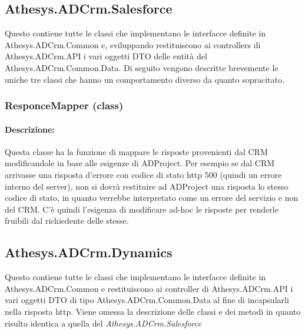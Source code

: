 \subsection{Athesys.ADCrm.Salesforce}\label{salesforce}
Questo  contiene tutte le classi che implementano le interfacce definite in Athesys.ADCrm.Common e, sviluppando  restituiscono ai controllers di Athesys.ADCrm.API i vari oggetti \gls{DTO} delle entità del  Athesys.ADCrm.Common.Data.
Di seguito vengono descritte brevemente le uniche tre classi che hanno un comportamento diverso da quanto sopracitato.

\subsubsection{ResponceMapper (class)}\label{responceMapperClass}
\paragraph{Descrizione:}
Questa classe ha la funzione di mappare le risposte provenienti dal \gls{CRM} modificandole in base alle esigenze di ADProject.
Per esempio se dal \gls{CRM} arrivasse una risposta d'errore con codice di stato \gls{http} 500 (quindi un errore interno del server), non si dovrà restituire ad ADProject una risposta lo stesso codice di stato, in quanto verrebbe interpretato come un errore del servizio e non del \gls{CRM}. C'è quindi l'esigenza di modificare ad-hoc le risposte per renderle fruibili dal richiedente delle stesse.

\subsection{Athesys.ADCrm.Dynamics}\label{dynamics}
Questo  contiene tutte le classi che implementano le interfacce definite in Athesys.ADCrm.Common e restituiscono ai controller di Athesys.ADCrm.API i vari oggetti \gls{DTO} di tipo Athesys.ADCrm.Common.Data al fine di incapsularli nella risposta \gls{http}.
Viene omessa la descrizione delle classi e dei metodi in quanto risulta identica a quella del  \textit{Athesys.ADCrm.Salesforce}

